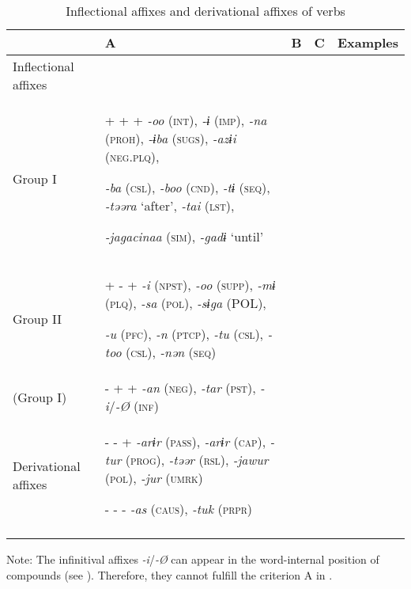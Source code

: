 \begin{table}
\caption{\label{tab:key:55}Inflectional affixes and derivational affixes of verbs}
\begin{tabularx}{\textwidth}{Xllll}
\lsptoprule
            & A &  B &  C &  Examples\\
\midrule
Inflectional affixes\\
\midrule
  Group I &  +  +  +  \textit{-oo} (\textsc{int}), \textit{-ɨ} (\textsc{imp}), \textit{-na} (\textsc{proh}), \textit{-ɨba} (\textsc{sugs}), \textit{-azɨi} (\textsc{neg}.\textsc{plq}),

\textit{-ba} (\textsc{csl}), \textit{-boo} (\textsc{cnd}), \textit{-tɨ} (\textsc{seq}), \textit{-təəra} ‘after’, \textit{-tai} (\textsc{lst}),

\textit{-jagacinaa} (\textsc{sim}), \textit{-gadɨ} ‘until’\\

\tablevspace

Group II &  +  -  +  \textit{-i} (\textsc{npst}), \textit{-oo} (\textsc{supp}), \textit{-mɨ} (\textsc{plq}), \textit{-sa} (\textsc{pol}), \textit{-sɨga} (POL),

\textit{-u} (\textsc{pfc}), \textit{-n} (\textsc{ptcp}), \textit{-tu} (\textsc{csl}), \textit{-too} (\textsc{csl}), \textit{-nən} (\textsc{seq})\\

\tablevspace
  (Group I)  &  -  +  +  \textit{-an} (\textsc{neg}), \textit{-tar} (\textsc{pst}), \textit{-i}/\textit{-Ø} (\textsc{inf})\\

\tablevspace
Derivational affixes&   -  -  +  \textit{-arɨr} (\textsc{pass}), \textit{-arɨr} (\textsc{cap}), \textit{-tur} (\textsc{prog}), \textit{-təər} (\textsc{rsl}), \textit{-jawur} (\textsc{pol}), \textit{-jur} (\textsc{umrk})

  -  -  -  \textit{-as} (\textsc{caus}), \textit{-tuk} (\textsc{prpr})\\
  \lspbottomrule
  \end{tabularx}
Note: The infinitival affixes \textit{-i}/\textit{-Ø} can appear in the word-internal position of compounds (see ). Therefore, they cannot fulfill the criterion A in .
\end{table}

